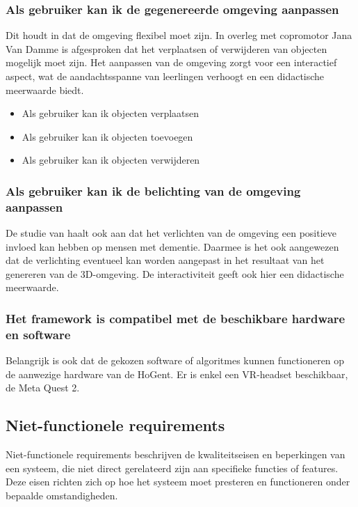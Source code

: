 \subsubsection{Als gebruiker kan ik de gegenereerde omgeving aanpassen}

Dit houdt in dat de omgeving flexibel moet zijn. In overleg met copromotor Jana Van Damme is afgesproken dat het verplaatsen of verwijderen van objecten mogelijk moet zijn. Het aanpassen van de omgeving zorgt voor een interactief aspect, wat de aandachtsspanne van leerlingen verhoogt en een didactische meerwaarde biedt.

\begin{itemize}
    \item Als gebruiker kan ik objecten verplaatsen
    \item Als gebruiker kan ik objecten toevoegen
    \item Als gebruiker kan ik objecten verwijderen
\end{itemize}

\subsubsection{Als gebruiker kan ik de belichting van de omgeving aanpassen}

De studie van \textcite{Raes2023} haalt ook aan dat het verlichten van de omgeving een positieve invloed kan hebben op mensen met dementie. Daarmee is het ook aangewezen dat de verlichting eventueel kan worden aangepast in het resultaat van het genereren van de 3D-omgeving. De interactiviteit geeft ook hier een didactische meerwaarde.

\subsubsection{Het framework is compatibel met de beschikbare hardware en software}

Belangrijk is ook dat de gekozen software of algoritmes kunnen functioneren op de aanwezige hardware van de HoGent. Er is enkel een VR-headset beschikbaar, de Meta Quest 2.

\subsection{Niet-functionele requirements}

Niet-functionele requirements beschrijven de kwaliteitseisen en beperkingen van een systeem, die niet direct gerelateerd zijn aan specifieke functies of features. Deze eisen richten zich op hoe het systeem moet presteren en functioneren onder bepaalde omstandigheden.

